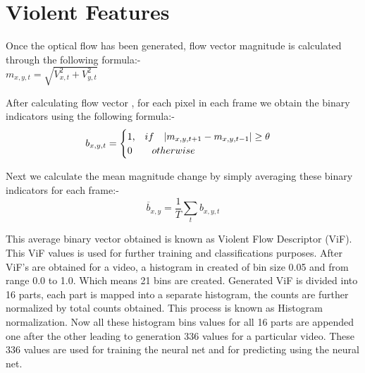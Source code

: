 \section{Violent Features}
Once the optical flow has been generated, flow vector magnitude is calculated through the following formula:- \\
$ m_{x,y,t} = \sqrt{V_{x,t}^2 + V_{y,t}^2} $ \\
\par
After calculating flow vector , for each pixel in each frame we obtain the binary indicators using the following formula:- \\
\begin{equation}
b_{x,y,t} = \begin{cases}
\text {1,\quad}if\quad |m_{x,y,t+1} - m_{x,y,t-1}| \geq \theta\\
\text {0\quad}   \quad otherwise
\end{cases}
\end{equation}
\par
Next we calculate the mean magnitude change by simply averaging these binary indicators for each frame:- 
\begin{equation}
\overline b_{x,y} = \frac{1}{T}\sum_{t}b_{x,y,t}
\end{equation}
\par
This average binary vector obtained is known as Violent Flow Descriptor (ViF). This ViF values is used for further training and classifications purposes.
	After ViF’s are obtained for a video, a histogram in created of bin size 0.05 and from range 0.0 to 1.0. Which means 21 bins are created. Generated ViF is divided into 16 parts, each part is mapped into a separate histogram, the counts are further normalized by total counts obtained. This process is known as Histogram normalization. Now all these histogram bins values for all 16 parts are appended one after the other leading to generation 336 values for a particular video. 
These 336 values are used for training the neural net and for predicting using the neural net.
